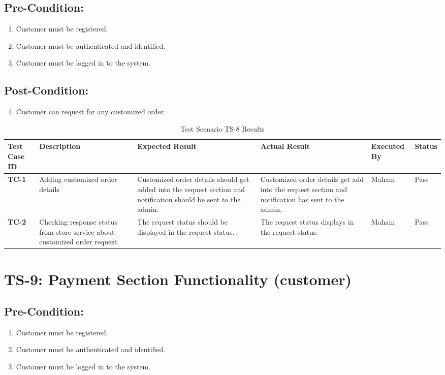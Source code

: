 \subsection{Pre-Condition:}
\begin{enumerate}
  \item Customer must be registered.
  \item Customer must be authenticated and identified.
  \item Customer must be logged in to the system.
\end{enumerate}
\subsection{Post-Condition:}
\begin{enumerate}
  \item Customer can request for any customized order.
\end{enumerate}

\begin{table}[H]
    \centering
   \begin{tabular}{ | m{1cm} | m{2.5cm}| m{2.7cm} | m{2.7cm} | m{1.7cm} | m{1.3cm} |}  
  \hline  \textbf{Test Case ID} &  \textbf{Description} &  \textbf{Expected Result} &  \textbf{Actual Result} &  \textbf{Executed By} &  \textbf{Status}  \\  \hline
  \textbf{TC-1} & Adding customized order details & Customized order details should get added into the request section and notification should be sent to the admin. & Customized order details get add into the request section and notification has sent to the admin. & Maham & Pass
  \\  \hline
  \textbf{TC-2} & Checking response status from store service about customized order request. & The request status should be displayed in the request status. & The request status displays in the request status. & Maham & Pass
  \\  \hline
  
\end{tabular}
    \caption{Test Scenario TS-8 Results}
    \label{tab: Test Scenario TS-8 Results}
\end{table}

\section{TS-9: Payment Section Functionality (customer)}
\subsection{Pre-Condition:}
\begin{enumerate}
  \item Customer must be registered.
  \item Customer must be authenticated and identified.
  \item Customer must be logged in to the system.
\end{enumerate}
